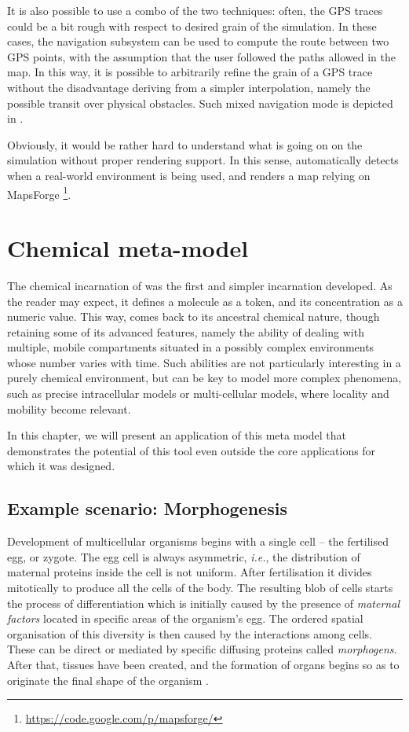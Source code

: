 \documentclass[12pt,a4paper,twoside,openright]{book}
\begin{document}
It is also possible to use a combo of the two techniques: often, the GPS traces could be a bit rough with respect to desired grain of the simulation.
%
In these cases, the navigation subsystem can be used to compute the route between two GPS points, with the assumption that the user followed the paths allowed in the map.
%
In this way, it is possible to arbitrarily refine the grain of a GPS trace without the disadvantage deriving from a simpler interpolation, namely the possible transit over physical obstacles.
%
Such mixed navigation mode is depicted in .

Obviously, it would be rather hard to understand what is going on on the simulation without proper rendering support.
%
In this sense, \alchemist{} automatically detects when a real-world environment is being used, and renders a map relying on MapsForge \footnote{\url{https://code.google.com/p/mapsforge/}}.



\chapter{Chemical meta-model}

The chemical incarnation of \alchemist{} was the first and simpler incarnation developed.
%
As the reader may expect, it defines a molecule as a token, and its concentration as a numeric value.
%
This way, \alchemist{} comes back to its ancestral chemical nature, though retaining some of its advanced features, namely the ability of dealing with multiple, mobile compartments situated in a possibly complex environments whose number varies with time.
%
Such abilities are not particularly interesting in a purely chemical environment, but can be key to model more complex phenomena, such as precise intracellular models or multi-cellular models, where locality and mobility become relevant.

In this chapter, we will present an application of this meta model that demonstrates the potential of this tool even outside the core applications for which it was designed.

\section{Example scenario: Morphogenesis}
\label{example-morphogenesis}
Development of multicellular organisms begins with a single cell -- the fertilised egg, or zygote.
%
The egg cell is always asymmetric, \emph{i.e.}, the distribution of maternal proteins inside the cell is not uniform.
%
After fertilisation it divides mitotically to produce all the cells of the body. 
%
The resulting blob of cells starts the process of differentiation which is initially caused by the presence of \emph{maternal factors} located in specific areas of the organism's egg.
%
The ordered spatial organisation of this diversity is then caused by the interactions among cells. These can be direct or mediated by specific diffusing proteins called \emph{morphogens}. 
%
After that, tissues have been created, and the formation of organs begins so as to originate the final shape of the organism \cite{alberts, gilbert2006-devbio}. 
\end{document}
